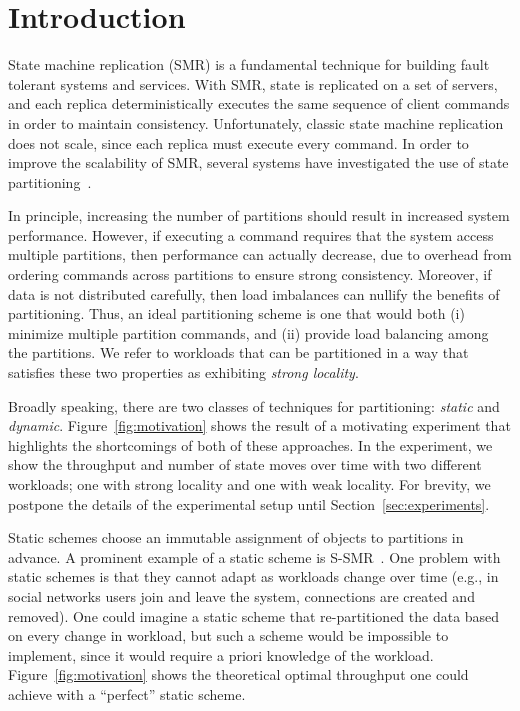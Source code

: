 \section{Introduction}

State machine replication (SMR) is a fundamental technique for
building fault tolerant systems and services. With SMR, state is
replicated on a set of servers, and each replica deterministically
executes the same sequence of client commands in order to maintain
consistency. Unfortunately, classic state machine replication does not
scale, since each replica must execute every command. In order to
improve the scalability of SMR, several systems have investigated the
use of state partitioning~\cite{facebookTAO, sciascia2012sdur,
  Aguilera:2007}.

In principle, increasing the number of partitions should result in
increased system performance. However, if executing a command
requires that the system access multiple partitions, then performance
can actually decrease, due to overhead from ordering commands across partitions to
ensure strong consistency. Moreover, if data is not distributed
carefully, then load imbalances can nullify the benefits of
partitioning.  Thus, an ideal partitioning scheme is one that would
both (i) minimize multiple partition commands, and (ii) provide load
balancing among the partitions. We refer to workloads that can be
partitioned in a way that satisfies these two properties as exhibiting
\emph{strong locality}.

Broadly speaking, there are two classes of techniques for
partitioning: \emph{static} and \emph{dynamic}.
Figure~\ref{fig:motivation} shows the result of a motivating experiment
that highlights the shortcomings of both of these approaches. In
the experiment, we show the throughput and number of state moves
over time with two different workloads; one with strong locality
and one with weak locality. For brevity, we postpone the details
of the experimental setup until Section~\ref{sec:experiments}.

Static schemes choose an immutable assignment of objects to partitions in
advance.  A prominent example of a
static scheme is S-SMR~\cite{bezerra2014ssmr}. One problem with static schemes is
that they cannot adapt as workloads change over time (e.g., in social
networks users join and leave the system, connections are created and
removed). One could imagine a static scheme that re-partitioned the
data based on every change in workload, but such a scheme would be
impossible to implement, since it would require a priori knowledge of
the workload. Figure~\ref{fig:motivation} shows the theoretical
optimal throughput one could achieve with a ``perfect'' static scheme.


